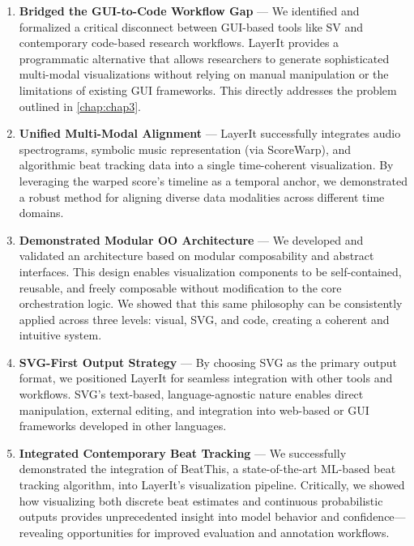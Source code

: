 \begin{enumerate}

\item \textbf{Bridged the GUI-to-Code Workflow Gap} — We identified and formalized a critical disconnect between GUI-based tools like SV and contemporary code-based research workflows. LayerIt provides a programmatic alternative that allows researchers to generate sophisticated multi-modal visualizations without relying on manual manipulation or the limitations of existing GUI frameworks. This directly addresses the problem outlined in \autoref{chap:chap3}.

\item \textbf{Unified Multi-Modal Alignment} — LayerIt successfully integrates audio spectrograms, symbolic music representation (via ScoreWarp), and algorithmic beat tracking data into a single time-coherent visualization. By leveraging the warped score's timeline as a temporal anchor, we demonstrated a robust method for aligning diverse data modalities across different time domains.

\item \textbf{Demonstrated Modular OO Architecture} — We developed and validated an architecture based on modular composability and abstract interfaces. This design enables visualization components to be self-contained, reusable, and freely composable without modification to the core orchestration logic. We showed that this same philosophy can be consistently applied across three levels: visual, SVG, and code, creating a coherent and intuitive system.

\item \textbf{SVG-First Output Strategy} — By choosing SVG as the primary output format, we positioned LayerIt for seamless integration with other tools and workflows. SVG's text-based, language-agnostic nature enables direct manipulation, external editing, and integration into web-based or GUI frameworks developed in other languages.

\item \textbf{Integrated Contemporary Beat Tracking} — We successfully demonstrated the integration of BeatThis, a state-of-the-art ML-based beat tracking algorithm, into LayerIt's visualization pipeline. Critically, we showed how visualizing both discrete beat estimates and continuous probabilistic outputs provides unprecedented insight into model behavior and confidence—revealing opportunities for improved evaluation and annotation workflows.


\end{enumerate}
